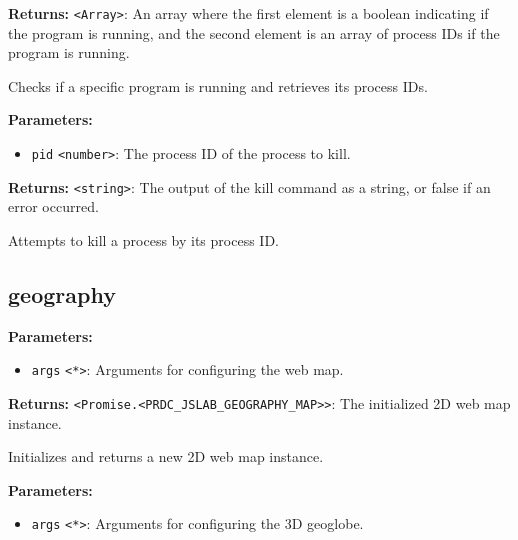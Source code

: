\documentclass[12pt,a4paper]{article}
\begin{document}
\noindent \textbf{Returns:} \texttt{<Array>}: An array where the first element is a boolean indicating if the program is running, 
                 and the second element is an array of process IDs if the program is running.

\noindent Checks if a specific program is running and retrieves its process IDs.

\vspace{5mm}
\noindent {}


\noindent \textbf{Parameters:}
\begin{itemize}
  \item \texttt{pid} \texttt{<number>}: The process ID of the process to kill.
\end{itemize}

\noindent \textbf{Returns:} \texttt{<string>}: The output of the kill command as a string, or false if an error occurred.

\noindent Attempts to kill a process by its process ID.


\subsection{geography}
\vspace{5mm}
\noindent {}


\noindent \textbf{Parameters:}
\begin{itemize}
  \item \texttt{args} \texttt{<*>}: Arguments for configuring the web map.
\end{itemize}

\noindent \textbf{Returns:} \texttt{<Promise.<PRDC\_JSLAB\_GEOGRAPHY\_MAP>>}: The initialized 2D web map instance.

\noindent Initializes and returns a new 2D web map instance.

\vspace{5mm}
\noindent {}


\noindent \textbf{Parameters:}
\begin{itemize}
  \item \texttt{args} \texttt{<*>}: Arguments for configuring the 3D geoglobe.
\end{itemize}
\end{document}
